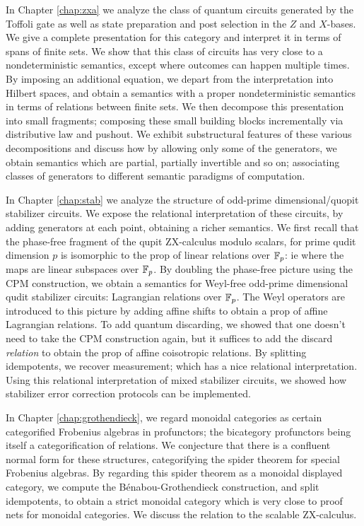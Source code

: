 \documentclass[12pt]{ociamthesis}  %
\begin{document}
In Chapter \ref{chap:zxa} we analyze the class of quantum circuits generated by the Toffoli gate as well as state preparation and post selection in the $Z$ and $X$-bases.  We give a complete presentation for this category and interpret it in terms of spans of finite sets.  We show that this class of circuits has very close to a nondeterministic semantics, except where outcomes can happen multiple times.  By imposing an additional equation, we depart from the interpretation into Hilbert spaces, and obtain a semantics with a proper  nondeterministic semantics in terms of relations between finite sets. We then decompose this presentation into small fragments; composing these small building blocks incrementally via distributive law and pushout.
We exhibit substructural features of these various decompositions and discuss how by allowing only some of the generators, we obtain semantics which are partial, partially invertible and so on; associating classes of generators to different semantic paradigms of computation.


In Chapter \ref{chap:stab}  we analyze the structure of odd-prime dimensional/quopit stabilizer circuits.
We expose the relational interpretation of these circuits, by adding generators at each point, obtaining a richer semantics.  We first recall that the phase-free fragment of the qupit ZX-calculus modulo scalars, for prime qudit dimension $p$ is isomorphic to the prop of linear relations over $\mathbb{F}_p$: ie where the maps are linear subspaces over $\mathbb{F}_p$.  By doubling the phase-free picture using the CPM construction, we obtain a semantics for Weyl-free odd-prime dimensional qudit stabilizer circuits: Lagrangian relations over $\mathbb{F}_p$.  The Weyl operators are introduced to this picture by adding affine shifts to obtain a prop of affine Lagrangian relations. To add quantum discarding, we showed that one doesn't need to take the CPM construction again, but it suffices to add the discard {\em relation} to obtain the prop of affine coisotropic relations.  By splitting idempotents, we recover measurement; which has a nice relational interpretation.  Using this relational interpretation of mixed stabilizer circuits, we showed how stabilizer error correction protocols can be implemented.


In Chapter \ref{chap:grothendieck}, we regard monoidal categories as certain categorified Frobenius algebras in profunctors; the bicategory profunctors being itself a categorification of relations.  We conjecture that there is a confluent normal form for these structures, categorifying the spider theorem for special Frobenius algebras.  By regarding this spider theorem as a monoidal displayed category, we compute the B\'enabou-Grothendieck construction, and split idempotents, to obtain a strict monoidal category which is very close to proof nets for monoidal categories. We discuss the relation to the scalable ZX-calculus.
\end{document}

